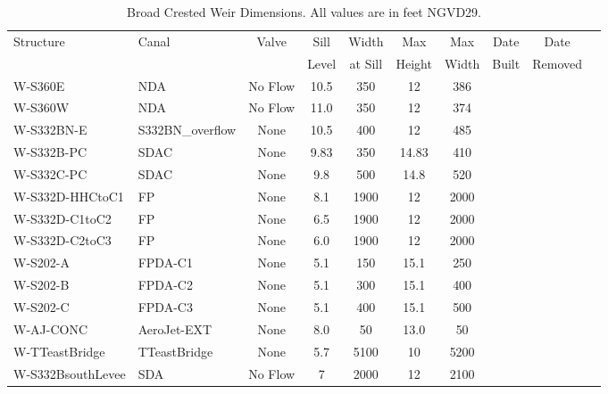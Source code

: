 \begin{table}[!h]
\caption[Broad Crested Weir Dimensions.]{Broad Crested Weir Dimensions. All values are in feet NGVD29.}
\label{tab:weirs}
\begin{tabular}{llcccccccc}
\hline
Structure         & Canal            & Valve     & Sill    & Width   & Max   & Max   & Date      & Date       \\
                  &                  &           & Level   & at Sill & Height& Width & Built     & Removed    \\
\hline
W-S360E           & NDA              & No Flow   &  10.5   & 350     & 12    & 386   &           &            \\
W-S360W           & NDA              & No Flow   &  11.0   & 350     & 12    & 374   &           &            \\
W-S332BN-E        & S332BN\_overflow & None      &  10.5   & 400     & 12    & 485   &           &            \\
W-S332B-PC        & SDAC             & None      &  9.83   & 350     & 14.83 & 410   &           &            \\
W-S332C-PC        & SDAC             & None      &  9.8    & 500     & 14.8  & 520   &           &            \\
W-S332D-HHCtoC1   & FP               & None      &  8.1    & 1900    & 12    & 2000  &           &            \\
W-S332D-C1toC2    & FP               & None      &  6.5    & 1900    & 12    & 2000  &           &            \\
W-S332D-C2toC3    & FP               & None      &  6.0    & 1900    & 12    & 2000  &           &            \\
W-S202-A          & FPDA-C1          & None      &  5.1    & 150     & 15.1  & 250   &           &            \\
W-S202-B          & FPDA-C2          & None      &  5.1    & 300     & 15.1  & 400   &           &            \\
W-S202-C          & FPDA-C3          & None      &  5.1    & 400     & 15.1  & 500   &           &            \\
W-AJ-CONC         & AeroJet-EXT      & None      &  8.0    & 50      & 13.0  & 50    &           &            \\
W-TTeastBridge    & TTeastBridge     & None      &  5.7    & 5100    & 10    & 5200  &           &            \\
W-S332BsouthLevee & SDA              & No Flow   &  7      & 2000    & 12    & 2100  &           &            \\

\end{tabular}
\end{table}
